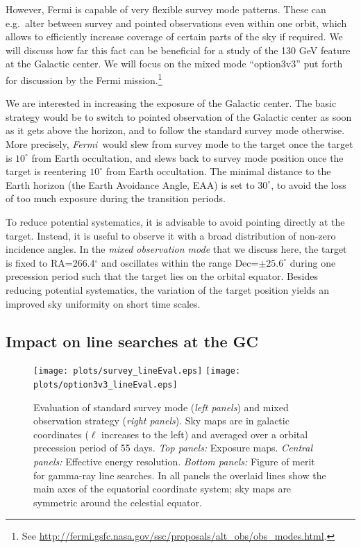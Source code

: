 \documentclass[aps,prd,superscriptaddress,showpacs,nofootinbib,fixlfloat, 12pt]{revtex4-1}
\newcommand{\Fermi}{{\slshape Fermi}}
\begin{document}
However, Fermi is capable of very flexible survey mode patterns. These can
e.g.~alter between survey and pointed observations even within one orbit,
which allows to efficiently increase coverage of certain parts of the sky if
required. We will discuss how far this fact can be beneficial for a
study of the 130 GeV feature at the Galactic center. We will
focus on the mixed mode ``option3v3'' put forth for discussion by the Fermi
mission.\footnote{See
\url{http://fermi.gsfc.nasa.gov/ssc/proposals/alt_obs/obs_modes.html}.}

We are interested in increasing the exposure of the Galactic center. The basic
strategy would be to switch to pointed observation of the Galactic center as
soon as it gets above the horizon, and to follow the standard survey mode
otherwise. More precisely, \Fermi\ would slew from survey mode to the target
once the target is $10^\circ$ from Earth occultation, and slews back to survey
mode position once the target is reentering $10^\circ$ from Earth occultation.
The minimal distance to the Earth horizon (the Earth Avoidance Angle, EAA) is
set to $30^\circ$, to avoid the loss of too much exposure during the
transition periods. 

To reduce potential systematics, it is advisable to avoid pointing directly at
the target. Instead, it is useful to observe it with a broad distribution of
non-zero incidence angles. In the \emph{mixed observation mode} that we
discuss here, the target is fixed to RA=266.4$^\circ$ and oscillates within
the range Dec=$\pm25.6^\circ$ during one precession period such that the
target lies on the orbital equator. Besides reducing potential systematics,
the variation of the target position yields an improved sky uniformity on
short time scales. 

\subsection{Impact on line searches at the GC}

\begin{figure}[t]
  \begin{center}
    \texttt{[image: plots/survey\_lineEval.eps]}
    \texttt{[image: plots/option3v3\_lineEval.eps]}
    \vspace{-0.5cm}
  \end{center}
  \caption{Evaluation of standard survey mode (\emph{left panels}) and mixed observation
    strategy (\emph{right panels}). Sky maps are in galactic coordinates ($\ell$ increases
    to the left) and averaged over a orbital precession period of 55 days.
    \emph{Top
      panels:} Exposure maps.
    \emph{Central panels:}
    Effective energy resolution.
  \emph{Bottom panels:} Figure of merit for gamma-ray line searches. In all
  panels the overlaid lines show the main axes of the equatorial coordinate
  system; sky maps are symmetric around the celestial equator.}
  \label{fig:mollweide}
\end{figure}
\end{document}
